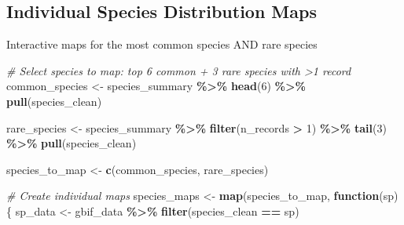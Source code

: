 \documentclass[
]{article}
\newenvironment{Shaded}{\begin{snugshade}}{\end{snugshade}}
\newcommand{\CommentTok}[1]{\textcolor[rgb]{0.56,0.35,0.01}{\textit{#1}}}
\newcommand{\ControlFlowTok}[1]{\textcolor[rgb]{0.13,0.29,0.53}{\textbf{#1}}}
\newcommand{\DecValTok}[1]{\textcolor[rgb]{0.00,0.00,0.81}{#1}}
\newcommand{\FunctionTok}[1]{\textcolor[rgb]{0.13,0.29,0.53}{\textbf{#1}}}
\newcommand{\NormalTok}[1]{#1}
\newcommand{\OtherTok}[1]{\textcolor[rgb]{0.56,0.35,0.01}{#1}}
\newcommand{\SpecialCharTok}[1]{\textcolor[rgb]{0.81,0.36,0.00}{\textbf{#1}}}
\begin{document}
\subsection{Individual Species Distribution
Maps}\label{individual-species-distribution-maps}

Interactive maps for the most common species AND rare species

\begin{Shaded}
\begin{Highlighting}[]
\CommentTok{\# Select species to map: top 6 common + 3 rare species with \textgreater{}1 record}
\NormalTok{common\_species }\OtherTok{\textless{}{-}}\NormalTok{ species\_summary }\SpecialCharTok{\%\textgreater{}\%}
  \FunctionTok{head}\NormalTok{(}\DecValTok{6}\NormalTok{) }\SpecialCharTok{\%\textgreater{}\%}
  \FunctionTok{pull}\NormalTok{(species\_clean)}

\NormalTok{rare\_species }\OtherTok{\textless{}{-}}\NormalTok{ species\_summary }\SpecialCharTok{\%\textgreater{}\%}
  \FunctionTok{filter}\NormalTok{(n\_records }\SpecialCharTok{\textgreater{}} \DecValTok{1}\NormalTok{) }\SpecialCharTok{\%\textgreater{}\%}
  \FunctionTok{tail}\NormalTok{(}\DecValTok{3}\NormalTok{) }\SpecialCharTok{\%\textgreater{}\%}
  \FunctionTok{pull}\NormalTok{(species\_clean)}

\NormalTok{species\_to\_map }\OtherTok{\textless{}{-}} \FunctionTok{c}\NormalTok{(common\_species, rare\_species)}

\CommentTok{\# Create individual maps}
\NormalTok{species\_maps }\OtherTok{\textless{}{-}} \FunctionTok{map}\NormalTok{(species\_to\_map, }\ControlFlowTok{function}\NormalTok{(sp) \{}
\NormalTok{  sp\_data }\OtherTok{\textless{}{-}}\NormalTok{ gbif\_data }\SpecialCharTok{\%\textgreater{}\%} \FunctionTok{filter}\NormalTok{(species\_clean }\SpecialCharTok{==}\NormalTok{ sp)}
  

\end{Highlighting}
\end{Shaded}
\end{document}
